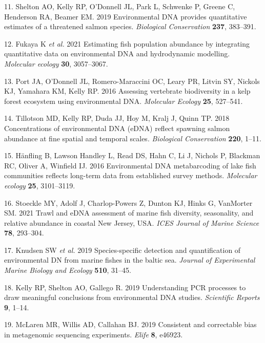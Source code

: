 \documentclass[
]{article}
\begin{document}
\leavevmode\hypertarget{ref-shelton2019biocons}{}%
11. Shelton AO, Kelly RP, O'Donnell JL, Park L, Schwenke P, Greene C,
Henderson RA, Beamer EM. 2019 Environmental DNA provides quantitative
estimates of a threatened salmon species. \emph{Biological Conservation}
\textbf{237}, 383--391.

\leavevmode\hypertarget{ref-Fukaya2020estimating}{}%
12. Fukaya K \emph{et al.} 2021 Estimating fish population abundance by
integrating quantitative data on environmental DNA and hydrodynamic
modelling. \emph{Molecular ecology} \textbf{30}, 3057--3067.

\leavevmode\hypertarget{ref-port2016assessing}{}%
13. Port JA, O'Donnell JL, Romero-Maraccini OC, Leary PR, Litvin SY,
Nickols KJ, Yamahara KM, Kelly RP. 2016 Assessing vertebrate
biodiversity in a kelp forest ecosystem using environmental DNA.
\emph{Molecular Ecology} \textbf{25}, 527--541.

\leavevmode\hypertarget{ref-tillotson2018concentrations}{}%
14. Tillotson MD, Kelly RP, Duda JJ, Hoy M, Kralj J, Quinn TP. 2018
Concentrations of environmental DNA (eDNA) reflect spawning salmon
abundance at fine spatial and temporal scales. \emph{Biological
Conservation} \textbf{220}, 1--11.

\leavevmode\hypertarget{ref-hanfling2016gillnet}{}%
15. Hänfling B, Lawson Handley L, Read DS, Hahn C, Li J, Nichols P,
Blackman RC, Oliver A, Winfield IJ. 2016 Environmental DNA metabarcoding
of lake fish communities reflects long-term data from established survey
methods. \emph{Molecular ecology} \textbf{25}, 3101--3119.

\leavevmode\hypertarget{ref-stoeckle2021trawl}{}%
16. Stoeckle MY, Adolf J, Charlop-Powers Z, Dunton KJ, Hinks G,
VanMorter SM. 2021 Trawl and eDNA assessment of marine fish diversity,
seasonality, and relative abundance in coastal New Jersey, USA.
\emph{ICES Journal of Marine Science} \textbf{78}, 293--304.

\leavevmode\hypertarget{ref-knudsen2019species}{}%
17. Knudsen SW \emph{et al.} 2019 Species-specific detection and
quantification of environmental DN from marine fishes in the baltic
sea. \emph{Journal of Experimental Marine Biology and Ecology}
\textbf{510}, 31--45.

\leavevmode\hypertarget{ref-kelly2019understanding}{}%
18. Kelly RP, Shelton AO, Gallego R. 2019 Understanding PCR processes to
draw meaningful conclusions from environmental DNA studies.
\emph{Scientific Reports} \textbf{9}, 1--14.

\leavevmode\hypertarget{ref-mclaren2019consistent}{}%
19. McLaren MR, Willis AD, Callahan BJ. 2019 Consistent and correctable
bias in metagenomic sequencing experiments. \emph{Elife} \textbf{8},
e46923.
\end{document}
